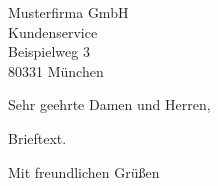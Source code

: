 



\begin{letter}{%
    Musterfirma GmbH\\
    Kundenservice\\
    Beispielweg 3\\
    80331 München%
  }

  \opening{Sehr geehrte Damen und Herren,}

  Brieftext.

  \closing{Mit freundlichen Grüßen}

\end{letter}


